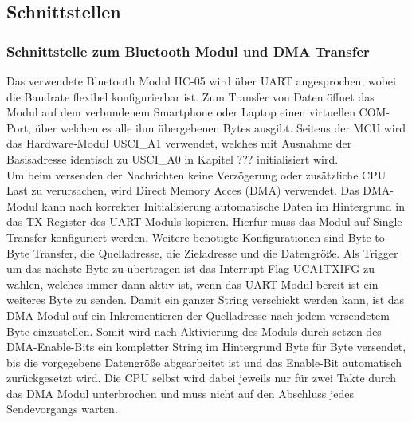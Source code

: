 

\subsection{Schnittstellen}


\subsubsection{Schnittstelle zum Bluetooth Modul und DMA Transfer}

Das verwendete Bluetooth Modul HC-05 wird über UART angesprochen, wobei die Baudrate flexibel konfigurierbar ist. Zum Transfer von Daten öffnet das Modul auf dem verbundenem Smartphone oder Laptop einen virtuellen COM-Port, über welchen es alle ihm übergebenen Bytes ausgibt. Seitens der MCU wird das Hardware-Modul USCI\_A1 verwendet, welches mit Ausnahme der Basisadresse identisch zu USCI\_A0 in Kapitel ??? initialisiert wird. \\

Um beim versenden der Nachrichten keine Verzögerung oder zusätzliche CPU Last zu verursachen, wird Direct Memory Acces (DMA) verwendet. Das DMA-Modul kann nach korrekter Initialisierung automatische Daten im Hintergrund in das TX Register des UART Moduls kopieren. Hierfür muss das Modul auf Single Transfer konfiguriert werden. Weitere benötigte Konfigurationen sind Byte-to-Byte Transfer, die Quelladresse, die Zieladresse und die Datengröße. Als Trigger um das nächste Byte zu übertragen ist das Interrupt Flag UCA1TXIFG zu wählen, welches immer dann aktiv ist, wenn das UART Modul bereit ist ein weiteres Byte zu senden. Damit ein ganzer String verschickt werden kann, ist das DMA Modul auf ein Inkrementieren der Quelladresse nach jedem versendetem Byte einzustellen. Somit wird nach Aktivierung des Moduls durch setzen des DMA-Enable-Bits ein kompletter String im Hintergrund Byte für Byte versendet, bis die vorgegebene Datengröße abgearbeitet ist und das Enable-Bit automatisch zurückgesetzt wird. Die CPU selbst wird dabei jeweils nur für zwei Takte durch das DMA Modul unterbrochen und muss nicht auf den Abschluss jedes Sendevorgangs warten.
